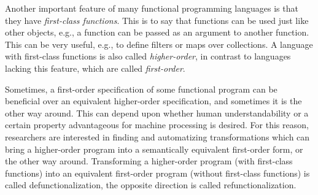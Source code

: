 Another important feature of many functional programming languages is that they have \textit{first-class functions}. This is to say that functions can be used just like other objects, e.g., a function can be passed as an argument to another function. This can be very useful, e.g., to define filters or maps over collections. A language with first-class functions is also called \textit{higher-order}, in contrast to languages lacking this feature, which are called \textit{first-order}.

Sometimes, a first-order specification of some functional program can be beneficial over an equivalent higher-order specification, and sometimes it is the other way around. This can depend upon whether human understandability or a certain property advantageous for machine processing is desired. For this reason, researchers are interested in finding and automatizing transformations which can bring a higher-order program into a semantically equivalent first-order form, or the other way around. Transforming a higher-order program (with first-class functions) into an equivalent first-order program (without first-class functions) is called defunctionalization\citep{reynolds72definitional}, the opposite direction is called refunctionalization\citep{danvy09refunctionalization}.

